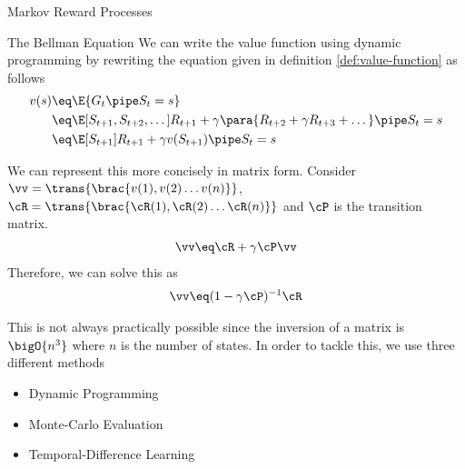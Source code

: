 \documentclass{article}
\begin{document}
\begin{ssection}{Markov Reward Processes}
\begin{ssubsection}{The Bellman Equation}
		We can write the value function using dynamic programming by rewriting
		the equation given in definition \ref{def:value-function} as follows
		\begin{align*}
			v(s) &\eq \E{G_t \pipe S_t = s} \\
			&\eq \E[S_{t + 1},S_{t + 2},\dots]{R_{t + 1} + \gamma \para{R_{t + 2} + \gamma R_{t + 3} + \dots} \pipe S_t = s} \\
			&\eq \E[S_{t + 1}]{R_{t + 1} + \gamma v(S_{t + 1}) \pipe S_t = s}
		\end{align*}

		We can represent this more concisely in matrix form. Consider $\vv =
		\trans{\brac{v(1), v(2) \dots v(n)}}$, $\boldsymbol{\cR} =
		\trans{\brac{\cR(1), \cR(2) \dots \cR(n)}}$ and $\cP$ is the transition
		matrix.
		\begin{align*}
			\vv \eq \boldsymbol{\cR} + \gamma \cP \vv
		\end{align*}
		Therefore, we can solve this as
		\begin{align*}
			\vv \eq (1 - \gamma \cP)^{-1} \boldsymbol{\cR}
		\end{align*}

		This is not always practically possible since the inversion of a matrix is $\bigO{n^3}$ where $n$ is the number of states. In order to tackle this, we use three different methods
		\begin{itemize}
			\item Dynamic Programming
			\item Monte-Carlo Evaluation
			\item Temporal-Difference Learning
		\end{itemize}
	\end{ssubsection}

\end{ssection}
\end{document}
